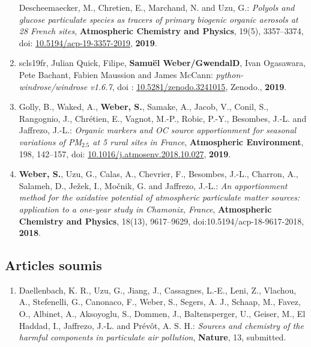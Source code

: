 \begin{enumerate}
        Descheemaecker, M., Chretien, E., Marchand, N. and Uzu, G.:
        \textit{Polyols and glucose particulate species as tracers of primary biogenic
        organic aerosols at 28 French sites},
        \textbf{Atmospheric Chemistry and Physics}, 19(5), 3357–3374,
        doi: \href{https://doi.org/10.5194/acp-19-3357-2019}{10.5194/acp-19-3357-2019},
        \textbf{2019}.
    \item scls19fr, Julian Quick, Filipe, \textbf{Samuël Weber/GwendalD}, Ivan Ogasawara, Pete
        Bachant, Fabien Maussion and James McCann: \textit{python-windrose/windrose
        v1.6.7},
        doi : \href{https://doi.org/10.5281/zenodo.3241015}{10.5281/zenodo.3241015}, 
        Zenodo., \textbf{2019}.
    \item Golly, B., Waked, A., \textbf{Weber, S.}, Samake, A., Jacob, V., Conil, S.,
        Rangognio, J., Chrétien, E., Vagnot, M.-P., Robic, P.-Y., Besombes, J.-L. and
        Jaffrezo, J.-L.:
        \textit{Organic markers and OC source apportionment for seasonal variations of
        PM$_{2.5}$ at 5 rural sites in France}, \textbf{Atmospheric Environment}, 198, 142–157,
        doi: \href{https://doi.org/10.1016/j.atmosenv.2018.10.027}{10.1016/j.atmosenv.2018.10.027},
        \textbf{2019}.
    \item \textbf{Weber, S.}, Uzu, G., Calas, A., Chevrier, F., Besombes, J.-L., Charron, A., Salameh, D., Ježek, I.,
        Močnik, G. and Jaffrezo, J.-L.:
        \textit{An apportionment method for the oxidative potential of atmospheric
        particulate matter sources: application to a one-year study in Chamonix, France}, 
        \textbf{Atmospheric Chemistry and Physics}, 18(13), 9617–9629, doi:10.5194/acp-18-9617-2018, \textbf{2018}.
\end{enumerate}

\subsection{Articles soumis}

\begin{enumerate}
    \item  Daellenbach, K. R., Uzu, G., Jiang, J., Cassagnes, L.-E., Leni, Z., Vlachou,
        A., Stefenelli, G., Canonaco, F., Weber, S., Segers, A. J., Schaap, M., Favez, O.,
        Albinet, A., Aksoyoglu, S., Dommen, J., Baltensperger, U., Geiser, M., El Haddad,
        I., Jaffrezo, J.-L. and Prévôt, A. S. H.: 
        \textit{Sources and chemistry of the harmful components in particulate air
        pollution}, \textbf{Nature}, 13, submitted.
\end{enumerate}


